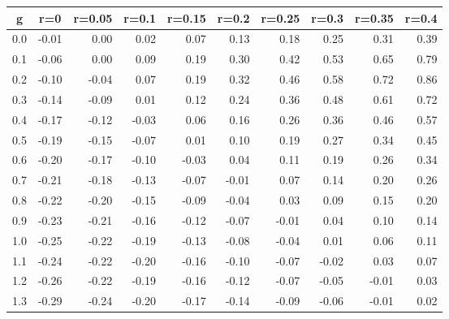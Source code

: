 %
\begin{table}[!tbp]
 \begin{center}
 \begin{tabular}{rrrrrrrrrr}\hline\hline
\multicolumn{1}{c}{g}&\multicolumn{1}{c}{r=0}&\multicolumn{1}{c}{r=0.05}&\multicolumn{1}{c}{r=0.1}&\multicolumn{1}{c}{r=0.15}&\multicolumn{1}{c}{r=0.2}&\multicolumn{1}{c}{r=0.25}&\multicolumn{1}{c}{r=0.3}&\multicolumn{1}{c}{r=0.35}&\multicolumn{1}{c}{r=0.4}\tabularnewline
\hline
0.0&-0.01& 0.00& 0.02& 0.07& 0.13& 0.18& 0.25& 0.31&0.39\tabularnewline
0.1&-0.06& 0.00& 0.09& 0.19& 0.30& 0.42& 0.53& 0.65&0.79\tabularnewline
0.2&-0.10&-0.04& 0.07& 0.19& 0.32& 0.46& 0.58& 0.72&0.86\tabularnewline
0.3&-0.14&-0.09& 0.01& 0.12& 0.24& 0.36& 0.48& 0.61&0.72\tabularnewline
0.4&-0.17&-0.12&-0.03& 0.06& 0.16& 0.26& 0.36& 0.46&0.57\tabularnewline
0.5&-0.19&-0.15&-0.07& 0.01& 0.10& 0.19& 0.27& 0.34&0.45\tabularnewline
0.6&-0.20&-0.17&-0.10&-0.03& 0.04& 0.11& 0.19& 0.26&0.34\tabularnewline
0.7&-0.21&-0.18&-0.13&-0.07&-0.01& 0.07& 0.14& 0.20&0.26\tabularnewline
0.8&-0.22&-0.20&-0.15&-0.09&-0.04& 0.03& 0.09& 0.15&0.20\tabularnewline
0.9&-0.23&-0.21&-0.16&-0.12&-0.07&-0.01& 0.04& 0.10&0.14\tabularnewline
1.0&-0.25&-0.22&-0.19&-0.13&-0.08&-0.04& 0.01& 0.06&0.11\tabularnewline
1.1&-0.24&-0.22&-0.20&-0.16&-0.10&-0.07&-0.02& 0.03&0.07\tabularnewline
1.2&-0.26&-0.22&-0.19&-0.16&-0.12&-0.07&-0.05&-0.01&0.03\tabularnewline
1.3&-0.29&-0.24&-0.20&-0.17&-0.14&-0.09&-0.06&-0.01&0.02\tabularnewline
\hline
\end{tabular}

\end{center}

\end{table}

